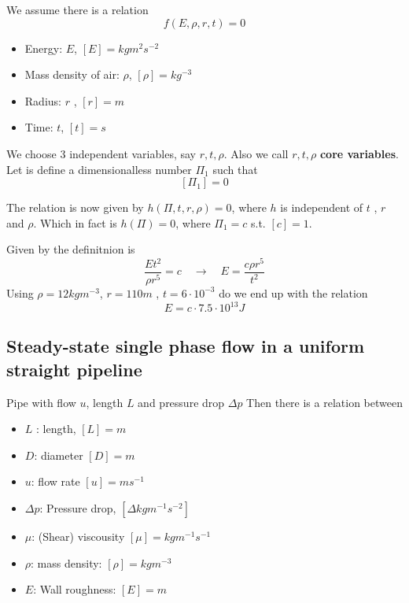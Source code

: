 \documentclass{article}
\theoremstyle{remark}
\begin{document}
We assume there is a relation \[
f\left( E, \rho, r , t \right) = 0
\] 

\begin{itemize}
  \item Energy: $E$, $\left[ E \right] = kg m^2 s^{-2}$ 
  \item Mass density of air: $\rho$, $\left[ \rho \right] = kg ^{-3}$
  \item Radius: $r$ , $\left[ r \right] = m$
  \item Time: $t$, $\left[ t \right] =s$ 
\end{itemize}

We choose 3 independent variables, say $r, t, \rho$. Also we call $r, t, \rho  $ \textbf{core variables}.  Let is define a dimensionalless number $\Pi_{1} $ such that \[
\left[ \Pi _{1} \right] = 0
\] 

The relation is now given by $h\left( \Pi , t, r, \rho \right) = 0$, where $h$ is independent of $t$ , $r$ and $\rho$. Which in fact is $h\left( \Pi  \right) = 0$, where $\Pi _{1} = c$ s.t. $\left[ c \right] = 1$.  
\par
Given by the definitnion is \[
\frac{E t^{2}}{\rho r ^{5}} = c \quad  \to \quad  E = \frac{c \rho r^{5}}{t^{2}}  
\] 
Using $\rho = 12 kgm^{-3}$, $r = 110m$ , $t = 6 \cdot 10^{-3}$ do we end up with the relation \[
E = c \cdot  7.5 \cdot  10 ^{13} J
\] 

\subsection{Steady-state single phase flow in a uniform straight pipeline}%
\label{sub:steady_state_single_phase_flow}

Pipe with flow $u$, length $L$ and pressure drop $\Delta p$ Then there is a relation between 
\begin{itemize}
  \item $L$ : length, $\left[ L \right] = m$ 
  \item $D$: diameter $\left[ D \right] = m$
  \item $u$: flow rate $\left[ u \right] = ms^{-1}$
  \item $\Delta p$: Pressure drop, $\left[ \Delta kg m^{-1} s^{-2} \right]$
  \item $\mu$: (Shear) viscousity $\left[ \mu \right] = kg m^{-1} s^{-1}$ 
  \item $\rho$: mass density: $\left[ \rho \right] = kg m^{-3}$
  \item $E$: Wall roughness: $\left[ E \right] = m$
\end{itemize}
\end{document}
